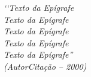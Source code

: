 


\begin{epigrafe}

	\vspace*{\fill}

	\begin{flushright}

	\textit{
	‘‘Texto da Epígrafe 		\\
	Texto da Epígrafe			\\
	Texto da Epígrafe			\\
	Texto da Epígrafe			\\
	Texto da Epígrafe''			\\
	(AutorCitação – 2000)}

	\end{flushright}

\end{epigrafe}